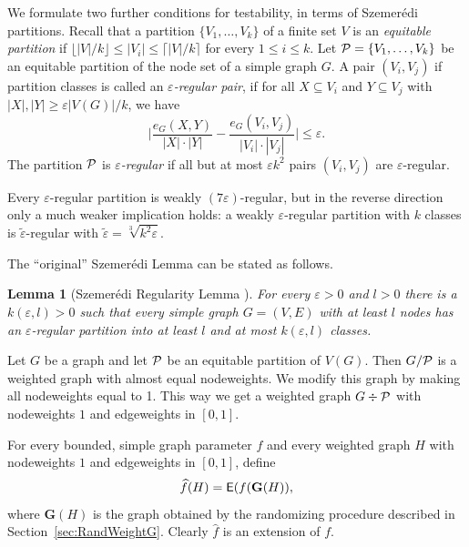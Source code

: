 \documentclass[12pt]{article}
\newtheorem{lemma}[theorem]{Lemma}
\numberwithin{equation}{section}
\def\eps{\varepsilon}
\def\iv{\widehat}
\def\E{{\sf E}}
\def\bG{{\mathbf G}}
\def\PP{{\cal P}}\def\QQ{{\cal Q}}\def\RR{{\cal R}}
\begin{document}
We formulate two further conditions for testability, in terms of
Szemer\'edi partitions.
Recall that a partition $\{V_1,\dots,V_k\}$
of a finite set $V$ is an {\it equitable partition} if $\lfloor
|V|/k\rfloor \le |V_i|\le \lceil |V|/k\rceil$ for every $1\le i\le
k$. Let $\PP=\{V_1,\dots,V_k\}$ be an equitable partition of
the node set of a simple graph $G$. A pair $(V_i,V_j)$ if partition
classes is called an {\it $\eps$-regular pair}, if for all
$X\subseteq V_i$ and $Y\subseteq V_j$ with $|X|,|Y|\ge\eps
|V(G)|/k$, we have
\[
\Biggl|
\frac{e_G(X,Y)}{|X|\cdot|Y|}-\frac{e_G(V_i,V_j)}{|V_i|\cdot|V_j|}\Biggr|
\le\eps.
\]
The partition $\PP$ is {\it $\eps$-regular} if all but at most
$\eps k^2$ pairs $(V_i,V_j)$ are $\eps$-regular.

Every $\eps$-regular partition is weakly $(7\eps)$-regular,
but in the reverse direction only a much weaker implication
holds: a weakly $\eps$-regular partition with $k$ classes is
$\tilde\eps$-regular with $\tilde\eps =\sqrt[3]{k^2\eps}$.

The ``original'' Szemer\'edi Lemma can be stated as follows.

\begin{lemma}[Szemer\'edi Regularity Lemma
\cite{Szem}]\label{lem:szem-strong}
For every $\eps>0$ and $l>0$ there is a $k(\eps,l)>0$ such that
every simple graph $G=(V,E)$ with at least $l$ nodes has an
$\eps$-regular partition into at least $l$ and at most $k(\eps,l)$
classes.
\end{lemma}

Let $G$ be a graph and let $\PP$ be an equitable partition of
$V(G)$. Then $G/\PP$ is a weighted graph with almost equal
nodeweights. We modify this graph by making all nodeweights equal to
1. This way we get a weighted graph $G\div\PP$ with nodeweights $1$
and edgeweights in $[0,1]$.

For every bounded, simple graph parameter $f$ and every weighted
graph $H$ with nodeweights $1$ and edgeweights in $[0,1]$, define
\[
\iv{f}(H)= \E(f(\bG(H)),
\]
where $\bG(H)$ is the graph obtained by the randomizing procedure
described in Section~\ref{sec:RandWeightG}. Clearly $\iv{f}$ is an
extension of $f$.
\end{document}
